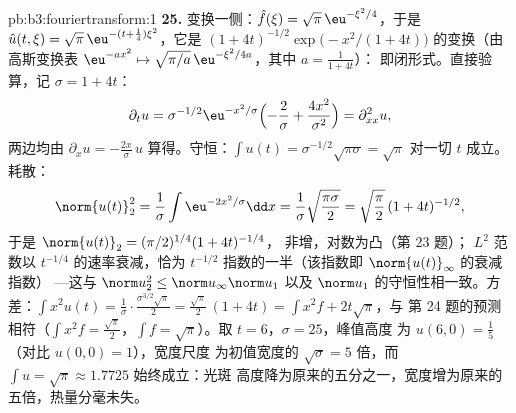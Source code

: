 \begin{solution}{pb:b3:fouriertransform:1}
\textbf{25.} 变换一侧：$\hat f(\xi) =
\sqrt\pi\,\eu^{-\xi^2/4}$，于是 $\hat u(t,\xi) =
\sqrt\pi\,\eu^{-(t + \frac14)\xi^2}$，它是
$(1 + 4t)^{-1/2}\exp\bigl(-x^2/(1+4t)\bigr)$ 的变换（由
高斯变换表 $\eu^{-ax^2} \mapsto
\sqrt{\pi/a}\,\eu^{-\xi^2/4a}$，其中 $a = \frac1{1+4t}$）：
即闭形式。直接验算，记 $\sigma = 1 + 4t$：
\[
\partial_tu = \sigma^{-1/2}\eu^{-x^2/\sigma}
\Bigl(-\frac2\sigma + \frac{4x^2}{\sigma^2}\Bigr)
= \partial^2_{xx}u ,
\]
两边均由 $\partial_xu =
-\frac{2x}\sigma\,u$ 算得。守恒：$\int u(t) =
\sigma^{-1/2}\sqrt{\pi\sigma} = \sqrt\pi$ 对一切 $t$ 成立。
耗散：
\[
\norm{u(t)}_2^2 = \frac1\sigma\int\eu^{-2x^2/\sigma}\dd x
= \frac1\sigma\sqrt{\frac{\pi\sigma}2}
= \sqrt{\frac\pi2}\,(1+4t)^{-1/2},
\]
于是 $\norm{u(t)}_2 = (\pi/2)^{1/4}(1+4t)^{-1/4}$，
非增，对数为凸（第 23 题）；
$L^2$ 范数以 $t^{-1/4}$ 的速率衰减，恰为
$t^{-1/2}$ 指数的一半（该指数即 $\norm{u(t)}_\infty$ 的衰减指数） ---这与
$\norm u_2^2 \leq \norm u_\infty\norm u_1$ 以及
$\norm u_1$ 的守恒性相一致。方差：$\int x^2u(t) =
\frac1\sigma\cdot\frac{\sigma^{3/2}\sqrt\pi}2 =
\frac{\sqrt\pi}2\,(1 + 4t) = \int x^2f + 2t\sqrt\pi$，与
第 24 题的预测相符（$\int x^2f = \frac{\sqrt\pi}2$，$\int
f = \sqrt\pi$）。取 $t = 6$，$\sigma = 25$，峰值高度
为 $u(6, 0) = \frac15$（对比 $u(0,0) = 1$），宽度尺度
为初值宽度的 $\sqrt\sigma = 5$ 倍，而 $\int u =
\sqrt\pi \approx 1.7725$ 始终成立：光斑
高度降为原来的五分之一，宽度增为原来的五倍，热量分毫未失。
\end{solution}

